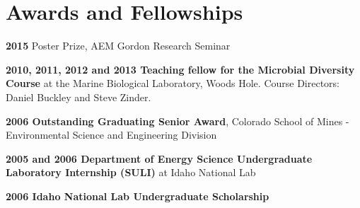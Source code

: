\documentclass[letterpaper]{article}
\renewenvironment{itemize}{
  \begin{list}{}{
    \setlength{\leftmargin}{1.5em}
  }
}{
  \end{list}
}
\begin{document}
\section*{Awards and Fellowships}
\begin{itemize}
    \item \textbf{2015} Poster Prize, AEM Gordon Research Seminar
    \item \textbf{2010, 2011, 2012 and 2013 Teaching fellow for the Microbial
        Diversity Course} at the Marine Biological Laboratory, Woods
        Hole.  Course Directors: Daniel Buckley and Steve Zinder.
    \item \textbf{2006 Outstanding Graduating Senior Award}, Colorado School of Mines - Environmental Science and Engineering Division
    \item \textbf{2005 and 2006 Department of Energy Science Undergraduate Laboratory Internship
        (SULI)} at Idaho National Lab
    \item \textbf{2006 Idaho National Lab Undergraduate Scholarship}
\end{itemize}
\end{document}
